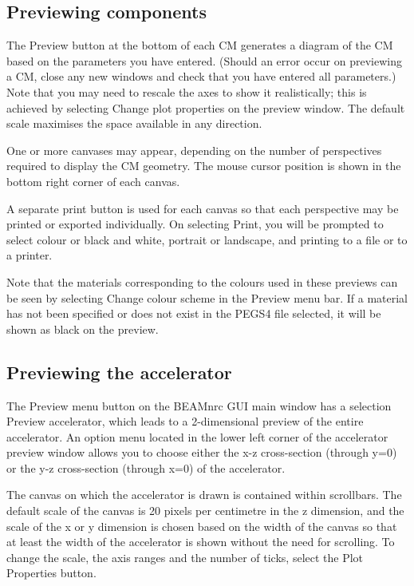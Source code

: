\documentclass[12pt,twoside]{article}
\begin{document}
\subsection{Previewing components}

The {\sf Preview} button at the bottom of each CM generates a diagram of
the CM based on the parameters you have entered.  (Should an error occur
on previewing a CM, close any new windows and check that
you have entered all parameters.)  Note that you may
need to rescale the axes to show it realistically; this is achieved by
selecting {\sf Change plot properties} on the preview window.  The
default scale maximises the space available in any direction.

One or more canvases may appear, depending on the number of perspectives
required to display the CM geometry.  The mouse cursor position is shown
in the bottom right corner of each canvas.

A separate print button is used for each canvas so that each perspective
may be printed or exported individually.  On selecting {\sf Print}, you will be
prompted to select colour or black and white, portrait or landscape, and
printing to a file or to a printer.

Note that the materials corresponding to the colours used in these
previews  can be seen by selecting {\sf Change colour scheme} in the
{\sf Preview} menu bar.  If a material has not been specified or does not
exist in the PEGS4 file selected, it will be shown as black on the preview.

\subsection{Previewing the accelerator}

The {\sf Preview} menu button on the {\sf BEAMnrc GUI} main window has a
selection {\sf Preview accelerator}, which leads to a 2-dimensional
preview of the entire accelerator.  An option menu located in the lower
left corner of the accelerator preview window allows you to choose
either the x-z cross-section (through y=0) or the y-z cross-section
(through x=0) of the accelerator.

The canvas on which the accelerator
is drawn is contained within scrollbars.  The default scale of the
canvas is 20 pixels per centimetre in the z dimension, and the scale of
the x or y dimension is chosen based on the width of the canvas so that
at least the width of the accelerator is shown without the need for scrolling.
To change the scale, the axis ranges and the number of ticks, select the
{\sf Plot Properties} button.
\end{document}
